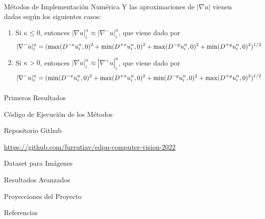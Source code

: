 \documentclass{beamer}
\begin{document}
\begin{frame}{Métodos de Implementación Numérica}
Y las aproximaciones de $|\nabla u|$ vienen dadas según los siguientes casos:

\medskip


\begin{enumerate}
    \item Si $\kappa \leq 0$, entonces $|\nabla u|_i^n \approx  |\nabla^- u|_i^n $, que viene dado por
    \begin{equation*}
        |\nabla^- u|_i^n =
        (\max(D^{-x}u_i^n,0)^2 + \min(D^{+x}u_i^n,0)^2 \\ 
         + \max(D^{-y}u_i^n,0)^2 + \min(D^{+y}u_i^n,0)^2 )^{1/2}
    \end{equation*}
    \medskip    
    \item Si $\kappa > 0$, entonces $|\nabla u|_i^n \approx  |\nabla^+ u|_i^n $, que viene dado por
    \begin{equation*}
        |\nabla^- u|_i^n =
        (\min(D^{-x}u_i^n,0)^2 + \max(D^{+x}u_i^n,0)^2 \\ 
         + \min(D^{-y}u_i^n,0)^2 + \max(D^{+y}u_i^n,0)^2 )^{1/2}
    \end{equation*}
    \begin{equation*}
        
    \end{equation*}
\end{enumerate}

\end{frame}

\begin{frame}{Primeros Resultados}
    
\end{frame}

\begin{frame}{Código de Ejecución de los Métodos}
    
Repositorio Github

\medskip

\url{https://github.com/furrutiav/edpn-computer-vision-2022}
    

\end{frame}

\begin{frame}{Dataset para Imágenes}
    
\end{frame}

\begin{frame}{Resultados Avanzados}
    
\end{frame}

\begin{frame}{Proyecciones del Proyecto}
    
\end{frame}

\begin{frame}{Referencias}
    
\end{frame}
\end{document}
